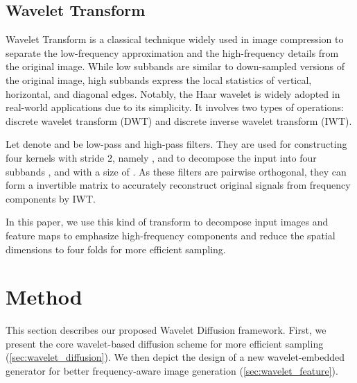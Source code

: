 \documentclass[10pt,twocolumn,letterpaper]{article}
\newcommand{\anh}[1]{\textcolor{cyan}{[#1]}}
\begin{document}
 
 


\subsection{Wavelet Transform}

Wavelet Transform is a classical technique widely used in image compression to separate the low-frequency approximation and the high-frequency details from the original image. While low subbands are similar to down-sampled versions of the original image, high subbands express the local statistics of vertical, horizontal, and diagonal edges. \iffalse Particularly, it decomposes each 2D image  into 4 subbands:  through low-pass  and high-pass filters , respectively. Each filter can be implemented as a convolution with stride as 2 and fixed parameters.\fi Notably, the Haar wavelet is widely adopted in real-world applications due to its simplicity. It involves two types of operations: discrete wavelet transform (DWT) and discrete inverse wavelet transform (IWT). 





\iffalse Let denote  and  as low-pass and high-pass filter where  is a defined constant. 
 From these two, we can construct four linear transformations, including a pair of low-band matrices  and a pair of high-band matrices  where  and . The discrete wavelet transform (DWT) of input image  can be factorized as below:



Meanwhile, the discrete inverse wavelet transform (IWT) can be written as:

\anh{The equations are hard to understand}
\fi

Let denote  and  be low-pass and high-pass filters. They are used for constructing four kernels with stride 2, namely , and   to decompose the input  into four subbands , and  with a size of . As these filters are pairwise orthogonal, they can form a  invertible matrix to accurately reconstruct original signals  from frequency components by IWT.



In this paper, we use this kind of transform to decompose input images and feature maps to emphasize high-frequency components and reduce the spatial dimensions to four folds for more efficient sampling.



\section{Method}\label{sec:method}
This section describes our proposed Wavelet Diffusion framework. First, we present the core wavelet-based diffusion scheme for more efficient sampling (\cref{sec:wavelet_diffusion}). We then depict the design of a new wavelet-embedded generator for better frequency-aware image generation (\cref{sec:wavelet_feature}). 
\end{document}
